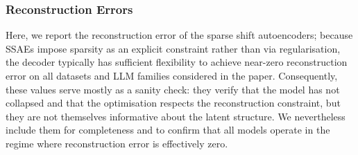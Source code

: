 \documentclass{article}
\begin{document}

    
    



 

\subsubsection{Reconstruction Errors}
\label{apx:recon}

Here, we report the reconstruction error of the sparse shift autoencoders; because SSAEs impose sparsity as an explicit constraint rather than via regularisation, the decoder typically has sufficient flexibility to achieve near-zero reconstruction error on all datasets and LLM families considered in the paper. Consequently, these values serve mostly as a sanity check: they verify that the model has not collapsed and that the optimisation respects the reconstruction constraint, but they are not themselves informative about the latent structure. We nevertheless include them for completeness and to confirm that all models operate in the regime where reconstruction error is effectively zero.
\end{document}
